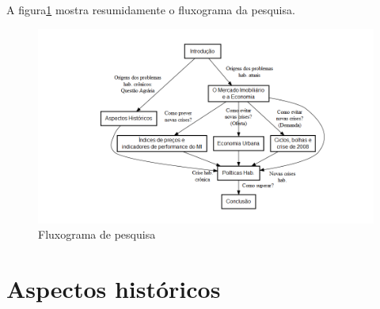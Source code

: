 \documentclass[
	12pt,				%
	oneside,			%
	a4paper,			%
	chapter=TITLE,		%
	section=TITLE,		%
	english,			%
	brazil				%
	]{abntex2}
\begin{document}
A figura\ref{fig:fluxo} mostra resumidamente o fluxograma da pesquisa.
\begin{figure}[H]

{\centering \includegraphics[width=0.8\linewidth]{images/fluxo-1} 

}

\caption{Fluxograma de pesquisa}\label{fig:fluxo}
\end{figure}
\hypertarget{historico}{%
\chapter{Aspectos históricos}\label{historico}}
\end{document}
